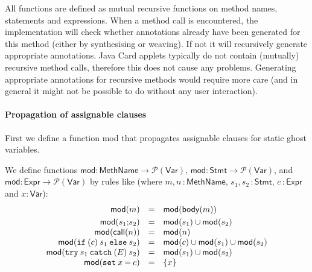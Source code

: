 All functions are defined as mutual recursive functions on method
names, statements and expressions. When a method call is encountered,
the implementation will check whether annotations already have been
generated for this method (either by synthesising or weaving). If not
it will recursively generate appropriate annotations. Java Card
applets typically do not contain (mutually) recursive method calls,
therefore this does not cause any problems. Generating appropriate
annotations for recursive methods would require more care (and in
general it might not be possible to do without any user interaction).

\paragraph{Propagation of assignable clauses}
First we define a function \textsf{mod} that propagates
assignable clauses for static ghost variables.

\begin{definition}We define functions
\(\mathsf{mod} \colon \mathsf{MethName} \rightarrow
\mathcal{P}(\mathsf{Var})\), 
\(
\mathsf{mod}  \colon  \mathsf{Stmt}   \rightarrow
\mathcal{P}(\mathsf{Var}) \), and 
\(\mathsf{mod}  \colon  \mathsf{Expr}   \rightarrow  \mathcal{P}(\mathsf{Var})\)
by rules like (where \(m,n\,\colon\mathsf{MethName}\),
\(s_1,s_2\,\colon\mathsf{Stmt}\), \(c\,\colon\mathsf{Expr}\) and \(x\colon\mathsf{Var}\)):
\[
\begin{array}{rcl}
\mathsf{mod}(m) & = & \mathsf{mod}(\mathsf{body}(m)) \smallskip \\
\mathsf{mod}(s_1 \mathtt{;} s_2) & = & \mathsf{mod}(s_1) \cup \mathsf{mod}(s_2)\\
\mathsf{mod}(\mathsf{call}(n)) & = &  \mathsf{mod}(n) \\
\mathsf{mod}(\mathtt{if\:(} c \mathtt{)\:} s_1 \mathtt{\:else\:} s_2)
&=& \mathsf{mod}(c) \cup \mathsf{mod}(s_1) \cup \mathsf{mod}(s_2)\\
\mathsf{mod}(\mathtt{try\:} s_1 \mathtt{\:catch\:(} E \mathtt{)\:}
s_2) & = & \mathsf{mod}(s_1) \cup \mathsf{mod}(s_2)\\
\mathsf{mod}(\mathtt{set\:}x \mathtt{\:=\:} c) & = &  \{ x \} 
\end{array}
\]
\end{definition}


